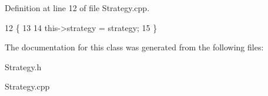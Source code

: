 Definition at line 12 of file Strategy.\+cpp.


\begin{DoxyCode}
12                                          \{
13 
14     this->strategy = strategy;
15 \}
\end{DoxyCode}


The documentation for this class was generated from the following files\+:\begin{DoxyCompactItemize}
\item 
Strategy.\+h\item 
Strategy.\+cpp\end{DoxyCompactItemize}
